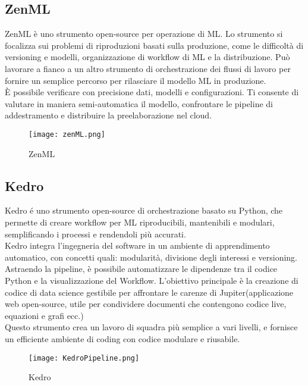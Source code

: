 \documentclass[../tesi.tex]{subfiles}
\begin{document}
  \subsection{ZenML} 
  ZenML è uno strumento open-source per operazione di ML.
  Lo strumento si focalizza sui problemi di riproduzioni basati sulla produzione, come le difficoltà di versioning e modelli, organizzazione di workflow di ML e la distribuzione. Può lavorare a fianco a un altro strumento di orchestrazione dei flussi di lavoro per fornire un semplice percorso per rilasciare il modello ML in produzione.\\
  È possibile verificare con precisione dati, modelli e configurazioni. Ti consente di valutare in maniera semi-automatica il modello, confrontare le pipeline di addestramento e distribuire la preelaborazione nel cloud.
  \begin{figure}[htbp]
    \centering
    \texttt{[image: zenML.png]} 
    \caption{ZenML}
    \end{figure}
  
  \subsection{Kedro}
Kedro é uno strumento open-source di orchestrazione basato su Python, che permette di creare workflow per ML riproducibili, mantenibili e modulari, semplificando i processi e rendendoli più accurati.\\
Kedro integra l’ingegneria del software in un ambiente di apprendimento automatico, con concetti quali: modularità, divisione degli interessi e versioning.\\
Astraendo la pipeline, è possibile automatizzare le dipendenze tra il codice Python e la visualizzazione del Workflow. L’obiettivo principale è la creazione di codice di data science gestibile per affrontare le carenze di Jupiter(applicazione web open-source, utile per condividere documenti che contengono codice live, equazioni e grafi ecc.)\\
Questo strumento crea un lavoro di squadra più semplice a vari livelli, e fornisce un efficiente ambiente di coding con codice modulare e riusabile.
\begin{figure}[htbp]
  \centering
  \texttt{[image: KedroPipeline.png]} 
  \caption{Kedro}
  \end{figure}  
\end{document}
